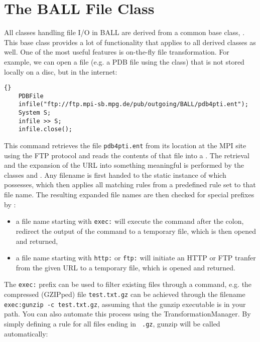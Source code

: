 \section{The BALL File Class}

All classes handling file I/O in BALL are derived from a common
base class, . This base class provides a lot of
functionality that applies to all derived classes as well.
One of the most useful features is on-the-fly file transformation.
For example, we can open a file (e.g. a PDB file using the  
class) that is not stored locally on a disc, but in the internet:

\begin{lstlisting}{}
	PDBFile
	infile("ftp://ftp.mpi-sb.mpg.de/pub/outgoing/BALL/pdb4pti.ent");
	System S;
	infile >> S;
	infile.close();
\end{lstlisting}

\noindent
This command retrieves the file {\tt pdb4pti.ent} from its location at the MPI
site using the FTP protocol and reads the contents of that file into a
. The retrieval and the expansion of the URL into something
meaningful is performed by the classes  and
. Any filename is first handed to the static instance of
 which  possesses, which then applies
all matching rules from a predefined rule set to that file name. The resulting
expanded file names are then checked for special prefixes by :
\begin{itemize}
	\item a file name starting with {\tt exec:} will execute the command after the
					colon, redirect the output of the command to a temporary file, which 	
					is then opened and returned,

	\item a file name starting with {\tt http:} or {\tt ftp:} will initiate
					an HTTP or FTP tranfer from the given URL to a temporary file, which
					is opened and returned.
\end{itemize}

\noindent 
The {\tt exec:} prefix can be used to filter existing files through a command, 
e.g. the compressed (GZIPped) file {\tt test.txt.gz} can be achieved through
the filename {\tt exec:gunzip -c test.txt.gz}, assuming that the gunzip
executable is in your path. You can also automate this process using the
TransformationManager. By simply defining a rule for all files ending in {\tt
.gz}, gunzip will be called automatically:

